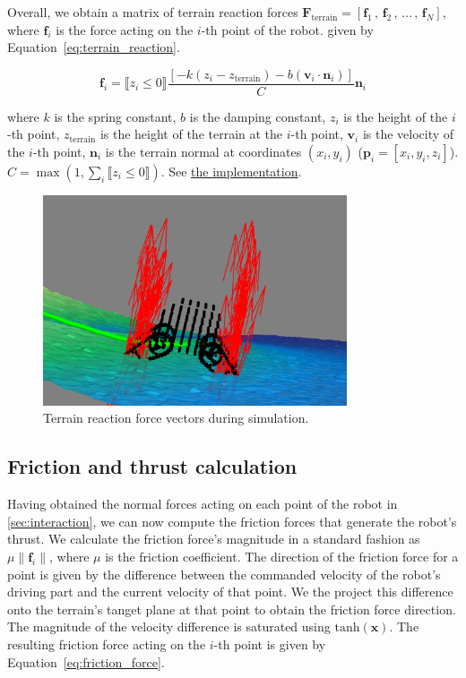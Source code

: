 \documentclass[a4paper,12pt]{article}
\begin{document}
Overall, we obtain a matrix of terrain reaction forces $\mathbf{F}_{\text{terrain}} = \left[\mathbf{f}_1 \, , \, \mathbf{f}_2 \, , \, \ldots \, , \, \mathbf{f}_N \right]$, where $\mathbf{f}_i$ is the force acting on the $i$-th point of the robot.
 given by Equation~\ref{eq:terrain_reaction}.

\begin{equation}
  \label{eq:terrain_reaction}
  \mathbf{f}_i = \llbracket z_i \leq 0\rrbracket \frac{\left[ -k \left(z_i - z_{\text{terrain}}\right) - b \left(\mathbf{v}_i \cdot \mathbf{n}_i\right) \right]}{C} \mathbf{n}_i
\end{equation}

where $k$ is the spring constant, $b$ is the damping constant, $z_i$ is the height of the $i$-th point, $z_{\text{terrain}}$ is the height of the terrain at the $i$-th point, $\mathbf{v}_i$ is the velocity of the $i$-th point, $\mathbf{n}_i$ is the terrain normal at coordinates $(x_i, y_i)$ ($\mathbf{p}_i = \left[ x_i , y_i , z_i\right]$). $C = \max (1, \sum_{i} \llbracket z_i \leq 0\rrbracket)$.
See \href{https://github.com/edavidk7/tracked_sim_rl/blob/d7b59702c6411e1dbda3be214524a2e22cceaac6/engine/engine.py#L55}{the implementation}.

\begin{figure}[H]
  \centering
  \includegraphics[width=0.8\textwidth]{fig/contact_forces.png}
  \caption{Terrain reaction force vectors during simulation.}
  \label{fig:terrain_reaction}
\end{figure}

\subsection{Friction and thrust calculation}
Having obtained the normal forces acting on each point of the robot in \ref{sec:interaction}, we can now compute the friction forces that generate the robot's thrust. We calculate the friction force's magnitude in a standard fashion as $\mu \left\| \mathbf{f}_i \right\|$, where $\mu$ is the friction coefficient. The direction of the friction force for a point is given by the difference between the commanded velocity of the robot's driving part and the current velocity of that point. We the project this difference onto the terrain's tanget plane at that point to obtain the friction force direction. The magnitude of the velocity difference is saturated using $\text{tanh}(\mathbf{x})$. The resulting friction force acting on the $i$-th point is given by Equation~\ref{eq:friction_force}.
\end{document}

